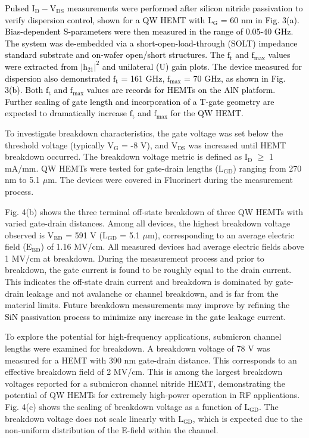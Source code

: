 \documentclass[journal]{IEEEtran}
\begin{document}
\textcolor{black}{Pulsed $\mathrm{I_D-V_{DS}}$ measurements were performed after silicon nitride passivation to verify dispersion control, shown for a QW HEMT with $\mathrm{L_G}$ = 60 nm in Fig. 3(a). Bias-dependent S-parameters were then measured in the range of 0.05-40 GHz. The system was de-embedded via a short-open-load-through (SOLT) impedance standard substrate and on-wafer open/short structures. The $\mathrm{f_t}$ and $\mathrm{f_{max}}$ values were extracted from $\mathrm{\vert h_{21}\vert^2}$ and unilateral (U) gain plots. The device measured for dispersion also demonstrated $\mathrm{f_t}$ = 161 GHz, $\mathrm{f_{max}}$ = 70 GHz, as shown in Fig. 3(b). Both $\mathrm{f_t}$ and $\mathrm{f_{max}}$ values are records for HEMTs on the AlN platform. Further scaling of gate length and incorporation of a T-gate geometry are expected to dramatically increase $\mathrm{f_t}$ and $\mathrm{f_{max}}$ for the QW HEMT.}

To investigate breakdown characteristics, the gate voltage was set below the threshold voltage (typically $\mathrm{V_G}$ = -8 V), and $\mathrm{V_{DS}}$ was increased until HEMT breakdown occurred. The breakdown voltage metric is defined as $\mathrm{I_D}$ $\geq$ 1 mA/mm. QW HEMTs were tested for gate-drain lengths ($\mathrm{L_{GD}}$) ranging from 270 nm to 5.1 $\mu$m. The devices were covered in Fluorinert during the measurement process.

Fig. 4(b) shows the three terminal off-state breakdown of three QW HEMTs with varied gate-drain distances. Among all devices, the highest breakdown voltage observed is $\mathrm{V_{BD}}$ = 591 V ($\mathrm{L_{GD}}$ = 5.1 $\mu$m), corresponding to an average electric field ($\mathrm{E_{BD}}$) of 1.16 MV/cm. All measured devices had average electric fields above 1 MV/cm at breakdown. During the measurement process and prior to breakdown, the gate current is found to be roughly equal to the drain current. This indicates the off-state drain current and breakdown is dominated by gate-drain leakage and not avalanche or channel breakdown, and is far from the material limits. 
\textcolor{black}{Future breakdown measurements may improve by refining the SiN passivation process to minimize any increase in the gate leakage current.}



To explore the potential for high-frequency applications, submicron channel lengths were examined for breakdown. A breakdown voltage of 78 V was measured for a HEMT with 390 nm gate-drain distance. This corresponds to an effective breakdown field of 2 MV/cm. This is among the largest breakdown voltages reported for a submicron channel nitride HEMT, demonstrating the potential of QW HEMTs for extremely high-power operation in RF applications. Fig. 4(c) shows the scaling of breakdown voltage as a function of $\mathrm{L_{GD}}$. The breakdown voltage does not scale linearly with $\mathrm{L_{GD}}$, which is expected due to the non-uniform distribution of the E-field within the channel.
\end{document}
